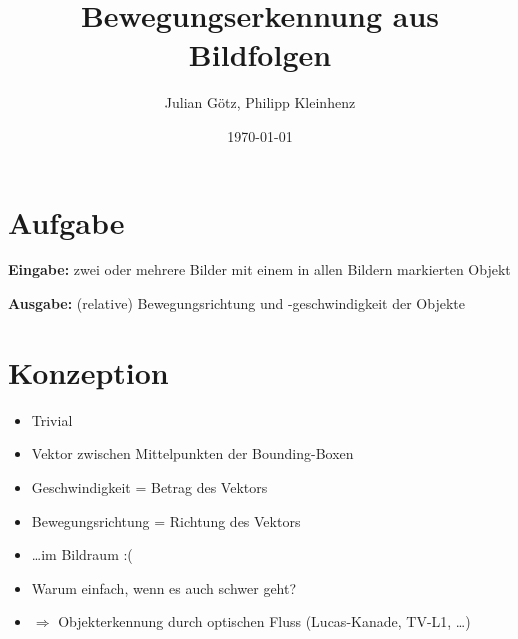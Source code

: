 \documentclass[10pt]{beamer}
\title{Bewegungserkennung aus Bildfolgen}
\subtitle{}
\date{\myformat\today}
\author{Julian G{\"o}tz, Philipp Kleinhenz}
\institute{Hochschule f{\"u}r Technik, Wirtschaft und Kultur Leipzig}
\begin{document}

\begin{frame}

\end{frame}

\maketitle
\def\code#1{\texttt{#1}}


\section{Aufgabe}
\begin{frame}{\secname}

\textbf{Eingabe: }zwei oder mehrere Bilder mit einem in allen Bildern markierten Objekt

\textbf{Ausgabe: }(relative) Bewegungsrichtung und -geschwindigkeit der Objekte

\end{frame}

\section{Konzeption}
\begin{frame}{\secname}

\begin{itemize}
	\item Trivial
	\item Vektor zwischen Mittelpunkten der Bounding-Boxen
	\item Geschwindigkeit = Betrag des Vektors
	\item Bewegungsrichtung = Richtung des Vektors
	\item \dots im Bildraum :(
\end{itemize}

\begin{itemize} 
	\item Warum einfach, wenn es auch schwer geht?
	\item $\Rightarrow$ Objekterkennung durch optischen Fluss (Lucas-Kanade, TV-L1, \dots)
\end{itemize}

\end{frame}
\end{document}
